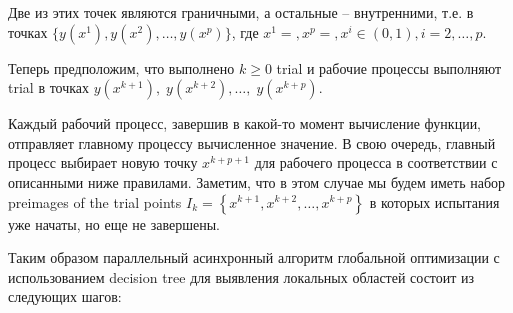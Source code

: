 \documentclass{svproc}
\begin{document}
Две из этих точек являются граничными, а остальные -- внутренними, т.е. в точках $\{y\left(x^1\right),y\left(x^2\right),\ldots,y\left(x^p\right)\}$, где
$x^1=,x^p=,x^i\in\left(0,1\right),i=2,\ldots,p$.

Теперь предположим, что выполнено $k\geq0$ trial и рабочие процессы выполняют trial в точках $y\left(x^{k+1}\right),\;y\left(x^{k+2}\right),\ldots,\;y\left(x^{k+p}\right)$.

Каждый рабочий процесс, завершив в какой-то момент вычисление функции, отправляет главному процессу вычисленное значение. В свою очередь, главный процесс выбирает новую точку $x^{k+p+1}$ для рабочего процесса в соответствии с описанными ниже правилами. Заметим, что в этом случае мы будем иметь набор preimages of the trial points 
$I_k=\left\{x^{k+1},x^{k+2},\ldots,x^{k+p}\right\}$
в которых испытания уже начаты, но еще не завершены.

Таким образом параллельный асинхронный алгоритм глобальной оптимизации с использованием decision tree для выявления локальных областей состоит из следующих шагов:
\end{document}
